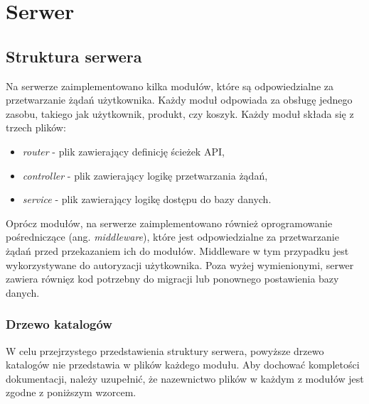 \section{Serwer}

\subsection{Struktura serwera}
Na serwerze zaimplementowano kilka modułów, które są odpowiedzialne za przetwarzanie żądań użytkownika. Każdy moduł odpowiada za obsługę jednego zasobu, takiego jak użytkownik, produkt, czy koszyk. Każdy moduł składa się z trzech plików:
\begin{itemize}
    \item \textit{router} - plik zawierający definicję ścieżek API,
    \item \textit{controller} - plik zawierający logikę przetwarzania żądań,
    \item \textit{service} - plik zawierający logikę dostępu do bazy danych.
\end{itemize}

Oprócz modułów, na serwerze zaimplementowano również oprogramowanie pośredniczące (ang. \textit{middleware}), które jest odpowiedzialne za przetwarzanie żądań przed przekazaniem ich do modułów. Middleware w tym przypadku jest wykorzystywane do autoryzacji użytkownika.
Poza wyżej wymienionymi, serwer zawiera równięz kod potrzebny do migracji lub ponownego postawienia bazy danych. 

\subsubsection{Drzewo katalogów}

\begin{samepage}
\tiny
{}
\end{samepage}

W celu przejrzystego przedstawienia struktury serwera, powyższe drzewo katalogów nie przedstawia w plików każdego modułu. Aby dochować kompletości dokumentacji, należy uzupełnić, że nazewnictwo plików w każdym z modułów jest zgodne z poniższym wzorcem.

